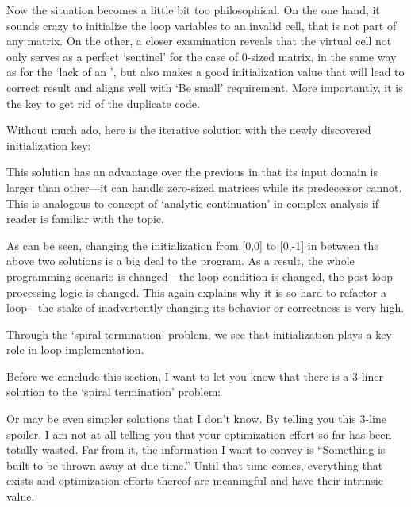 Now the situation becomes a little bit too philosophical.
On the one hand, it sounds crazy to initialize the loop variables to an invalid cell, that is not
part of any matrix.
On the other, a closer examination reveals that the virtual cell not only serves as a perfect
`sentinel' for the case of $0$-sized matrix,
in the same way as   for the `lack of an ',
but also makes a good initialization value that will lead to correct result and aligns well with
`Be small' requirement.
More importantly, it is the key to get rid of the duplicate code.


Without much ado, here is the iterative solution with the newly discovered initialization key:

This solution has an advantage over the previous in that
its input domain is larger than other---it can handle zero-sized matrices while its predecessor
cannot.
This is analogous to concept of `analytic continuation' in complex analysis if
reader is familiar with the topic.


As can be seen, changing the initialization from [0,0] to [0,-1] in between the above two solutions
is a big deal to the program.
As a result, the whole programming scenario is changed---the loop condition is changed,
the post-loop processing logic is changed.
This again explains why it is so hard to refactor a loop---the stake of inadvertently changing
its behavior or correctness is very high.


Through the `spiral termination' problem, we see that initialization plays a key role in loop
implementation.


Before we conclude this section, I want to let you know that there is a 3-liner solution to the
`spiral termination' problem:

Or may be even simpler solutions that I don't know.
By telling you this 3-line spoiler, I am not at all telling you that your
optimization effort so far has been totally wasted.
Far from it, the information I want to convey is ``Something is built to be thrown away
at due time.''
Until that time comes, everything that exists and optimization efforts thereof are
meaningful and have their intrinsic value.


